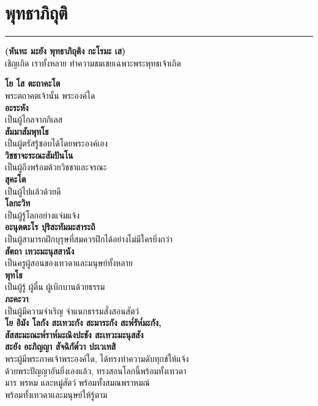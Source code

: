 \documentclass[12pt]{article}
\begin{document}
\pagebreak

\section{พุทธาภิถุติ}
\hrule
\begin{center}
\textbf{(หันทะ มะยัง พุทธาภิถุติง กะโรมะ เส)}\\
เชิญเถิด เราทั้งหลาย ทำความชมเชยเฉพาะพระพุทธเจ้าเถิด
\end{center}
\textbf{โย โส ตะถาคะโต\\}
\indent พระตถาคตเจ้านั้น พระองค์ใด\\
\textbf{อะระหัง\\}
\indent เป็นผู้ไกลจากกิเลส\\
\textbf{สัมมาสัมพุทโธ\\}
\indent เป็นผู้ตรัสรู้ชอบได้โดยพระองค์เอง\\
\textbf{วิชชาจะระณะสัมปันโน\\}
\indent เป็นผู้ถึงพร้อมด้วยวิชชาและจรณะ\\
\textbf{สุคะโต\\}
\indent เป็นผู้ไปแล้วด้วยดี\\
\textbf{โลกะวิท\\}
\indent เป็นผู้รู้โลกอย่างแจ่มแจ้ง\\
\textbf{อะนุตตะโร ปุริสะทัมมะสาระถิ\\}
\indent เป็นผู้สามารถฝึกบุรุษที่สมควรฝึกได้อย่างไม่มีใครยิ่งกว่า\\
\textbf{สัตถา เทวะมะนุสสานัง\\}
\indent เป็นครูผู้สอนของเทวดาและมนุษย์ทั้งหลาย\\
\textbf{พุทโธ\\}
\indent เป็นผู้รู้ ผู้ตื่น ผู้เบิกบานด้วยธรรม\\
\textbf{ภะคะวา\\}
\indent เป็นผู้มีความจำเริญ จำแนกธรรมสั่งสอนสัตว์\\
\textbf{โย อิมัง โลกัง สะเทวะกัง สะมาระกัง สะพ๎รัห๎มะกัง, \\
สัสสะมะณะพ๎ราห๎มะณิงปะชัง สะเทวะมะนุสสัง\\
 สะยัง อะภิญญา สัจฉิกัต๎วา ปะเวเทสิ\\}
\indent พระผู้มีพระภาคเจ้าพระองค์ใด, ได้ทรงทำความดับทุกข์ให้แจ้ง \\
\indent ด้วยพระปัญญาอันยิ่งเองแล้ว, ทรงสอนโลกนี้พร้อมทั้งเทวดา \\
\indent มาร พรหม และหมู่สัตว์ พร้อมทั้งสมณพราหมณ์\\
\indent พร้อมทั้งเทวดาและมนุษย์ให้รู้ตาม\\
\end{document}
